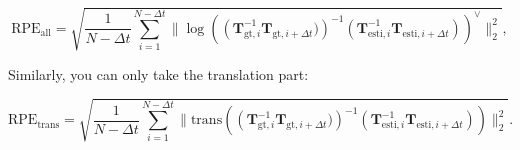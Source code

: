 \begin{equation}
\mathrm{RPE}_{\mathrm{all}} = \sqrt{ \frac{1}{N-\Delta t} \sum_{i=1}^{N-\Delta t} \| \log \left ( \left(\bm{T}_{\mathrm{gt},i}^{-1} \bm{T}_{\mathrm{gt},i+\Delta t} )\right)^{-1 } \left(\bm{T}_{\mathrm{esti},i}^{-1} \bm{T}_{\mathrm{esti},i+\Delta t}\right)\right)^{ \vee} \|_2^2},
\end{equation}

Similarly, you can only take the translation part:

\begin{equation}
\mathrm{RPE}_{\mathrm{trans}} = \sqrt{ \frac{1}{N-\Delta t} \sum_{i=1}^{N-\Delta t} \| \mathrm{trans } \left( \left(\bm{T}_{\mathrm{gt},i}^{-1} \bm{T}_{\mathrm{gt},i+\Delta t} )\right)^ {-1} \left(\bm{T}_{\mathrm{esti},i}^{-1} \bm{T}_{\mathrm{esti},i+\Delta t}\right)\right ) \|_2^2}.
\end{equation}


